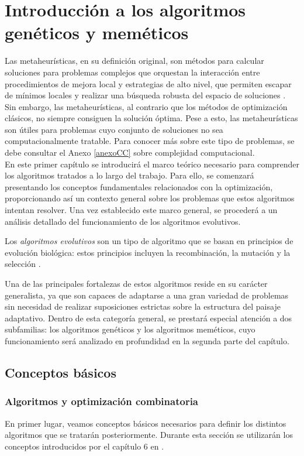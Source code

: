 \chapter{Introducción a los algoritmos genéticos y meméticos} \label{chapter:1}
 Las metaheurísticas, en su definición original, son métodos para calcular soluciones para problemas complejos que orquestan la interacción entre procedimientos de mejora local y estrategias de alto nivel, que permiten escapar de mínimos locales y realizar una búsqueda robusta del espacio de soluciones \cite{metah-hb}. Sin embargo, las metaheurísticas, al contrario que los métodos de optimización clásicos, no siempre consiguen la solución óptima. Pese a esto, las metaheurísticas son útiles para problemas cuyo conjunto de soluciones no sea computacionalmente tratable. Para conocer más sobre este tipo de problemas, se debe consultar el Anexo \ref{anexoCC} sobre complejidad computacional.\\
 
En este primer capítulo se introducirá el marco teórico necesario para comprender los algoritmos tratados a lo largo del trabajo. Para ello, se comenzará presentando los conceptos fundamentales relacionados con la optimización, proporcionando así un contexto general sobre los problemas que estos algoritmos intentan resolver. Una vez establecido este marco general, se procederá a un análisis detallado del funcionamiento de los algoritmos evolutivos.

\begin{definition}
Los \textit{algoritmos evolutivos} son un tipo de algoritmo que se basan en principios de evolución biológica: estos principios incluyen la recombinación, la mutación y la selección \cite{evolutionary}.
\end{definition}

Una de las principales fortalezas de estos algoritmos reside en su carácter generalista, ya que son capaces de adaptarse a una gran variedad de problemas sin necesidad de realizar suposiciones estrictas sobre la estructura del paisaje adaptativo. Dentro de esta categoría general, se prestará especial atención a dos subfamilias: los algoritmos genéticos y los algoritmos meméticos, cuyo funcionamiento será analizado en profundidad en la segunda parte del capítulo.
\section{Conceptos básicos}\label{intro:intro}
\subsection{Algoritmos y optimización combinatoria}
En primer lugar, veamos conceptos básicos necesarios para definir los distintos algoritmos que se tratarán posteriormente. Durante esta sección se utilizarán los conceptos introducidos por el capítulo 6 en \cite{metah-hb}.

